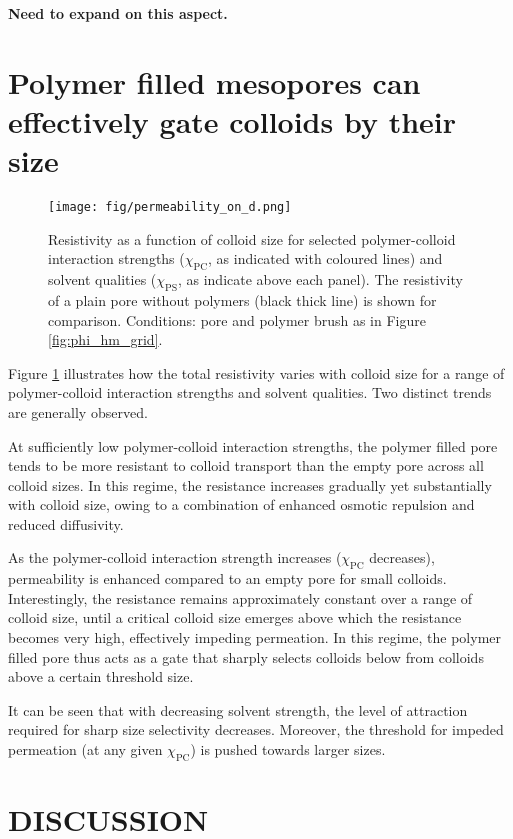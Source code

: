 \documentclass[12pt, a4paper]{article}
\begin{document}
\textbf{Need to expand on this aspect.}


\section{Polymer filled mesopores can effectively gate colloids by their size}

\begin{figure}
    \centering
    \texttt{[image: fig/permeability\_on\_d.png]}
    \caption{
    Resistivity as a function of colloid size for selected polymer-colloid interaction strengths ($\chi_{\text{PC}}$, as indicated with coloured lines) 
    and solvent qualities ($\chi_{\text{PS}}$, as indicate above each panel). 
    The resistivity of a plain pore without polymers (black thick line) is shown for comparison. 
    Conditions: pore and polymer brush as in Figure \ref{fig:phi_hm_grid}. 
    }
    \label{fig:R_vs_d}
\end{figure}

Figure \ref{fig:R_vs_d} illustrates how the total resistivity varies with colloid size for a range of polymer-colloid interaction strengths and solvent qualities. 
Two distinct trends are generally observed.

At sufficiently low polymer-colloid interaction strengths, the polymer filled pore tends to be more resistant to colloid transport than the empty pore across  all colloid sizes. 
In this regime, the resistance increases gradually yet substantially with colloid size, owing to a combination of enhanced osmotic repulsion and reduced diffusivity.

As the polymer-colloid interaction strength increases ($\chi_{\text{PC}}$ decreases), permeability is enhanced compared to an empty pore for small colloids. 
Interestingly, the resistance remains approximately constant over a range of colloid size, until a critical colloid size emerges above which the resistance becomes very high, 
effectively impeding permeation. 
In this regime, the polymer filled pore thus acts as a gate that sharply selects colloids below from colloids above a certain threshold size.

It can be seen that with decreasing solvent strength, the level of attraction required for sharp size selectivity decreases. 
Moreover, the threshold for impeded permeation (at any given $\chi_{\text{PC}}$) is pushed towards larger sizes.


\section{DISCUSSION}
\end{document}

